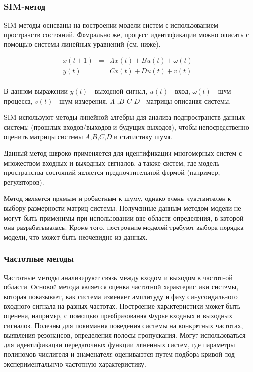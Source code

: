\subsubsection{SIM-метод}

SIM методы основаны на построении модели систем с использованием пространств состояний. Фомрально же, процесс идентификации можно описать с помощью системы линейных уравнений (см. ниже). 

\begin{equation}
  \begin{array}{rcl}
    x(t+1) & = &Ax(t)+Bu(t)+\omega(t) \\
    y(t) &= & Cx(t)+Du(t)+v(t) \\
  \end{array}
    \label{eq:sim_ss}
\end{equation}

В данном выражении $ y(t) $ - выходной сигнал,  $u(t)$ - вход, $\omega(t)$ -
шум процесса, $v(t)$ - шум измерения, $A$ ,$B$ $C$ $D$ - матрицы описания
системы.

SIM используют методы линейной алгебры для анализа подпространств данных
системы (прошлых входов/выходов и будущих выходов),
чтобы непосредственно оценить матрицы системы $A$,$B$,$C$,$D$ и статистику шума.

Данный метод широко применяется для идентификации многомерных систем с
множеством входных и выходных сигналов, а также систем, где модель пространства
состояний является предпочтительной формой (например, регуляторов).

Метод является прямым и робастным к шуму, однако очень чувствителен к выбору
размерности матриц системы. Полученные данным методом модели не могут быть
применимы при использовании вне области определения, в которой она
разрабатывалась. Кроме того, построение моделей требуют выбора порядка модели,
что может быть неочевидно из данных.

\subsubsection{Частотные методы}

Частотные методы анализируют связь между входом и выходом в частотной области. Основой метода является оценка частотной характеристики системы, которая показывает, как система изменяет амплитуду и фазу синусоидального входного сигнала на разных частотах. Построение характеристики может быть оценена, например, с помощью преобразования Фурье входных и выходных сигналов.
Полезны для понимания поведения системы на конкретных частотах, выявления резонансов, определения полосы пропускания. Могут использоваться для идентификации передаточных функций линейных систем, где параметры полиномов числителя и знаменателя оцениваются путем подбора кривой под экспериментальную частотную характеристику.

